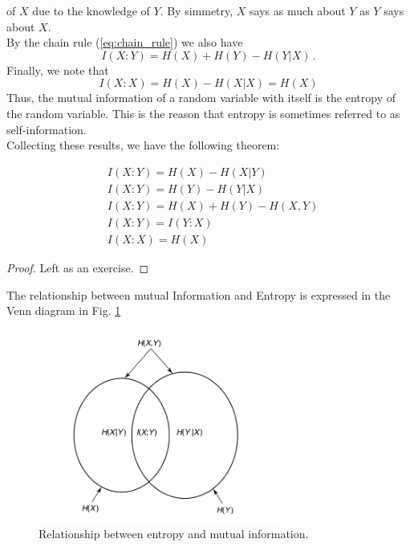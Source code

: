 of $X$ due to the knowledge of $Y$. By simmetry, $X$ says as much about $Y$ as $Y$ says about $X$. \\By the chain rule (\ref{eq:chain_rule}) we also have
\begin{equation*}
    I(X:Y) = H(X) + H(Y) - H(Y|X) \, .
\end{equation*}
Finally, we note that
\begin{equation}
    I(X:X) = H(X) - H(X|X) = H(X)
\end{equation}
Thus, the mutual information of a random variable with itself is the entropy of the random variable. This is the reason that entropy is sometimes referred to as self-information.
\\Collecting these results, we have the following theorem:
\begin{theorem}
\label{th:Mutual_information_and_entropy}
    \begin{align}
        & I(X:Y) = H(X) - H(X|Y) \\
        & I(X:Y) = H(Y) - H(Y|X) \\
        & I(X:Y) = H(X) + H(Y) - H(X,Y) \\
        & I(X:Y) = I(Y:X) \\
        & I(X:X) = H(X) 
    \end{align}
\end{theorem}
\begin{proof}
    Left as an exercise.
\end{proof}
The relationship between mutual Information and Entropy is expressed in the Venn diagram in Fig. \ref{fig:information_and_entropy}
\begin{figure}[h]
    \centering
    \includegraphics[width=8cm]{img/information_and_entropy.png}
    \caption{Relationship between entropy and mutual information.}
    \label{fig:information_and_entropy}
\end{figure}
